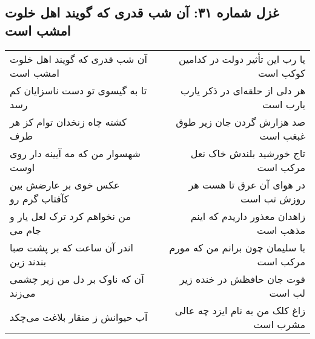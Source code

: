 \begin{center}
\section*{غزل شماره ۳۱: آن شب قدری که گویند اهل خلوت امشب است}
\label{sec:sh031}
\begin{longtable}{l p{0.5cm} r}
آن شب قدری که گویند اهل خلوت امشب است
&&
یا رب این تأثیر دولت در کدامین کوکب است
\\
تا به گیسوی تو دست ناسزایان کم رسد
&&
هر دلی از حلقه‌ای در ذکر یارب یارب است
\\
کشته چاه زنخدان توام کز هر طرف
&&
صد هزارش گردن جان زیر طوق غبغب است
\\
شهسوار من که مه آیینه دار روی اوست
&&
تاج خورشید بلندش خاک نعل مرکب است
\\
عکس خوی بر عارضش بین کآفتاب گرم رو
&&
در هوای آن عرق تا هست هر روزش تب است
\\
من نخواهم کرد ترک لعل یار و جام می
&&
زاهدان معذور داریدم که اینم مذهب است
\\
اندر آن ساعت که بر پشت صبا بندند زین
&&
با سلیمان چون برانم من که مورم مرکب است
\\
آن که ناوک بر دل من زیر چشمی می‌زند
&&
قوت جان حافظش در خنده زیر لب است
\\
آب حیوانش ز منقار بلاغت می‌چکد
&&
زاغ کلک من به نام ایزد چه عالی مشرب است
\\
\end{longtable}
\end{center}
